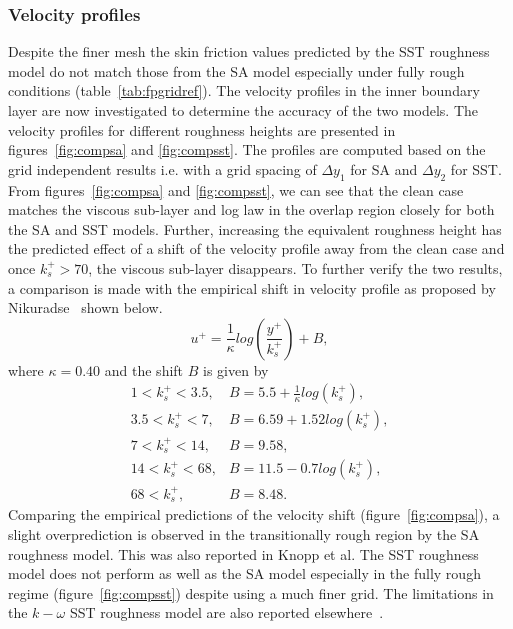 \subsubsection{Velocity profiles}
Despite the finer mesh the skin friction values predicted by the SST roughness model do not match those from the SA model especially under fully rough conditions (table~\ref{tab:fpgridref}). The velocity profiles in the inner boundary layer are now investigated to determine the accuracy of the two models. The velocity profiles for different roughness heights are presented in figures~\ref{fig:compsa} and \ref{fig:compsst}. The profiles are computed based on the grid independent results i.e. with a grid spacing of $\Delta y_1$ for SA and $\Delta y_2$ for SST.
From figures~\ref{fig:compsa} and \ref{fig:compsst}, we can see that the clean case matches the viscous sub-layer and log law in the overlap region closely for both the SA and SST models. Further, increasing the equivalent roughness height has the predicted effect of a shift of the velocity profile away from the clean case and once $k_s^+>70$, the viscous sub-layer disappears. 
To further verify the two results, a comparison is made with the empirical shift in velocity profile as proposed by Nikuradse~\cite{aupoix2015sstroughness} shown below.
\begin{equation}
     u^+ = \frac{1}{\kappa}log(\frac{y^+}{k_s^+}) + B, 
\end{equation}{}
where $\kappa=0.40$ and the shift $B$ is given by
\begin{eqnarray*}
     1 < k_s^+ < 3.5, &B = 5.5 + \frac{1}{\kappa}log(k_s^+), \\
     3.5 < k_s^+ < 7, &B = 6.59 + 1.52 log(k_s^+), \\
     7 < k_s^+ < 14, &B = 9.58, \\
     14 < k_s^+ < 68, &B = 11.5 - 0.7log(k_s^+), \\
     68 < k_s^+ , &B = 8.48.
\end{eqnarray*}{}
\noindent Comparing the empirical predictions of the velocity shift (figure~\ref{fig:compsa}), a slight overprediction is observed in the transitionally rough region by the SA roughness model. This was also reported in Knopp et al\cite{knopp2009new}. The SST roughness model does not perform as well as the SA model especially in the fully rough regime (figure~\ref{fig:compsst}) despite using a much finer grid. The limitations in the $k-\omega$ SST roughness model are also reported elsewhere~\cite{knopp2009new,aupoix2015sstroughness,SSTrough}. 
